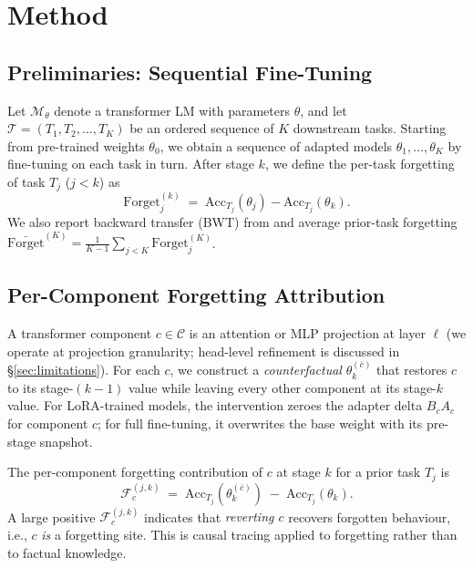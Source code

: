 \section{Method}
\label{sec:method}

\subsection{Preliminaries: Sequential Fine-Tuning}
\label{sec:method:seq}

Let $\mathcal{M}_\theta$ denote a transformer LM with parameters $\theta$, and let $\mathcal{T} = (T_1, T_2, \dots, T_K)$ be an ordered sequence of $K$ downstream tasks. Starting from pre-trained weights $\theta_0$, we obtain a sequence of adapted models $\theta_1, \dots, \theta_K$ by fine-tuning on each task in turn. After stage $k$, we define the per-task forgetting of task $T_j$ ($j<k$) as
\begin{equation}
\mathrm{Forget}_j^{(k)} \;=\; \mathrm{Acc}_{T_j}(\theta_j) - \mathrm{Acc}_{T_j}(\theta_k).
\end{equation}
We also report backward transfer (BWT) from \citet{lopez2017gem} and average prior-task forgetting $\bar{\mathrm{Forget}}^{(K)} = \frac{1}{K-1}\sum_{j<K} \mathrm{Forget}_j^{(K)}$.

\subsection{Per-Component Forgetting Attribution}
\label{sec:method:attribution}

A transformer component $c \in \mathcal{C}$ is an attention or MLP projection at layer $\ell$ (we operate at projection granularity; head-level refinement is discussed in \S\ref{sec:limitations}). For each $c$, we construct a \textit{counterfactual} $\theta_k^{(\bar c)}$ that restores $c$ to its stage-$(k{-}1)$ value while leaving every other component at its stage-$k$ value. For LoRA-trained models, the intervention zeroes the adapter delta $B_c A_c$ for component $c$; for full fine-tuning, it overwrites the base weight with its pre-stage snapshot.

The per-component forgetting contribution of $c$ at stage $k$ for a prior task $T_j$ is
\begin{equation}
\label{eq:F-per-comp}
\mathcal{F}_c^{(j,k)} \;=\; \mathrm{Acc}_{T_j}(\theta_k^{(\bar c)}) \;-\; \mathrm{Acc}_{T_j}(\theta_k).
\end{equation}
A large positive $\mathcal{F}_c^{(j,k)}$ indicates that \textit{reverting $c$} recovers forgotten behaviour, i.e., $c$ \textit{is} a forgetting site. This is causal tracing \citep{meng2022locating} applied to forgetting rather than to factual knowledge.


